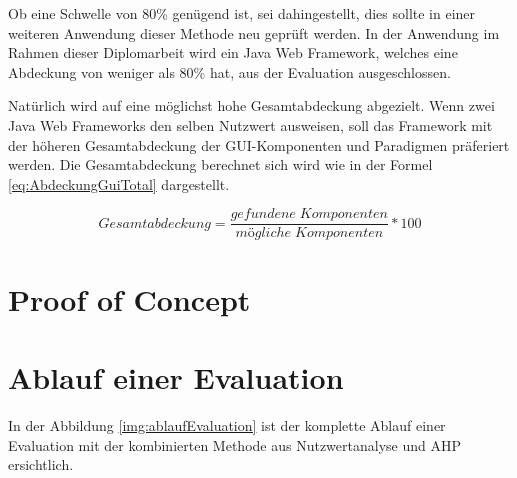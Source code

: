   Ob eine Schwelle von 80\% genügend ist, sei dahingestellt, dies sollte in
  einer weiteren Anwendung dieser Methode neu geprüft werden. In der Anwendung
  im Rahmen dieser Diplomarbeit wird ein Java Web Framework, welches eine
  Abdeckung von weniger als 80\% hat, aus der Evaluation ausgeschlossen.
  
  Natürlich wird auf eine möglichst hohe Gesamtabdeckung abgezielt. Wenn zwei
  Java Web Frameworks den selben Nutzwert ausweisen, soll das Framework mit der
  höheren Gesamtabdeckung der GUI-Komponenten und Paradigmen präferiert werden.
  Die Gesamtabdeckung berechnet sich wird wie in der Formel
  \ref{eq:AbdeckungGuiTotal} dargestellt.
  
  \begin{equation}
    \label{eq:AbdeckungGuiTotal}
    Gesamtabdeckung = \frac
    	{gefundene\;Komponenten}
    	{mögliche\;Komponenten} * 100
  \end{equation} 

  
  
  \section{Proof of Concept}
    
  \section{Ablauf einer Evaluation}
  
  In der Abbildung \ref{img:ablaufEvaluation} ist der komplette Ablauf einer
  Evaluation mit der kombinierten Methode aus Nutzwertanalyse und
  \ac{AHP} ersichtlich.
  

